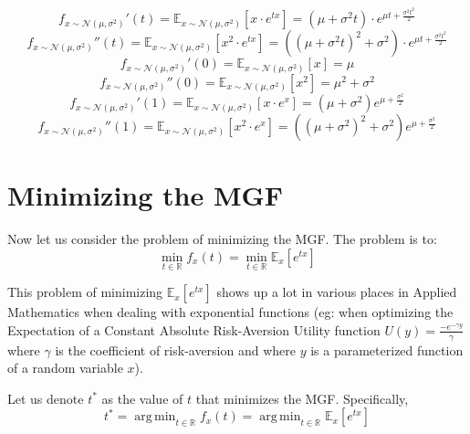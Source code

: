 \documentclass[10pt]{amsart}
\DeclareMathOperator*{\argmin}{arg\,min}
\begin{document}
\begin{equation}
f_{x\sim \mathcal{N}(\mu, \sigma^2)}'(t) = \mathbb{E}_{x\sim \mathcal{N}(\mu, \sigma^2)}[x \cdot e^{tx}] = (\mu + \sigma^2t)\cdot e^{\mu t + \frac {\sigma^2 t^2} 2} \label{eq:normmgfderiv}
\end{equation}
\begin{equation}
f_{x\sim \mathcal{N}(\mu, \sigma^2)}''(t) = \mathbb{E}_{x\sim \mathcal{N}(\mu, \sigma^2)}[x^2 \cdot e^{tx}] = ((\mu + \sigma^2t)^2 + \sigma^2)\cdot e^{\mu t + \frac {\sigma^2 t^2} 2} \label{eq:normmgfdoublederiv}
\end{equation}
\begin{equation}
f_{x\sim \mathcal{N}(\mu, \sigma^2)}'(0) = \mathbb{E}_{x\sim \mathcal{N}(\mu, \sigma^2)}[x] = \mu
\end{equation}
\begin{equation}
f_{x\sim \mathcal{N}(\mu, \sigma^2)}''(0) = \mathbb{E}_{x\sim \mathcal{N}(\mu, \sigma^2)}[x^2] = \mu^2 + \sigma^2
\end{equation}
\begin{equation}
f_{x\sim \mathcal{N}(\mu, \sigma^2)}'(1) = \mathbb{E}_{x\sim \mathcal{N}(\mu, \sigma^2)}[x\cdot e^x] = (\mu + \sigma^2)e^{\mu+ \frac {\sigma^2} 2}
\end{equation}
\begin{equation}
f_{x\sim \mathcal{N}(\mu, \sigma^2)}''(1) = \mathbb{E}_{x\sim \mathcal{N}(\mu, \sigma^2)}[x^2\cdot e^x] = ((\mu + \sigma^2)^2 + \sigma^2)e^{\mu+ \frac {\sigma^2} 2}
\end{equation}

\section{Minimizing the MGF}
Now let us consider the problem of minimizing the MGF. The problem is to:
$$\min_{t\in \mathbb{R}} f_x(t) = \min_{t\in \mathbb{R}} \mathbb{E}_x[e^{tx}]$$

This problem of minimizing $\mathbb{E}_x[e^{tx}]$ shows up a lot in various places in Applied Mathematics when dealing with exponential functions (eg: when optimizing the Expectation of a Constant Absolute Risk-Aversion Utility function $U(y) = \frac {-e^{-\gamma y}} {\gamma}$ where $\gamma$ is the coefficient of risk-aversion and where $y$ is a parameterized function of a random variable $x$).

Let us denote $t^*$ as the value of $t$ that minimizes the MGF. Specifically,
$$t^* = \argmin_{t\in \mathbb{R}} f_x(t) = \argmin_{t \in \mathbb{R}} \mathbb{E}_x[e^{tx}]$$
\end{document}
